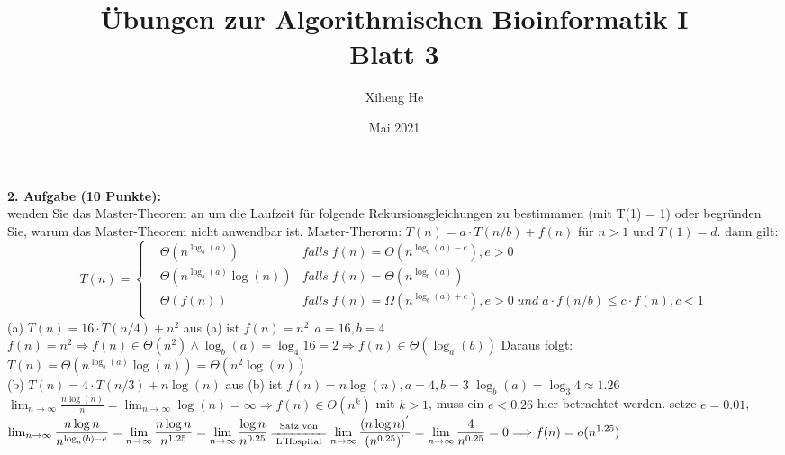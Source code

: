 \documentclass{article}
\title{Übungen zur Algorithmischen Bioinformatik I\\
Blatt 3}
\author{Xiheng He }
\date{Mai 2021}
\begin{document}
\maketitle
\begin{flushleft}
\textbf{2. Aufgabe (10 Punkte):}\\
wenden Sie das Master-Theorem an um die Laufzeit für folgende Rekursionsgleichungen zu bestimmmen (mit T(1) = 1) oder begründen Sie, warum das Master-Theorem nicht anwendbar ist.
\newline
Master-Therorm: $T(n) = a \cdot T(n/b) + f(n)$ für $n > 1$ und $T(1) = d$. dann gilt:
    $$ T(n)=\left\{
    \begin{aligned}
    &\Theta(n^{\log_b (a)}) & falls \; f(n) = O(n^{\log_b (a)-e}), e > 0 \\
    &\Theta(n^{\log_b (a)}\log(n)) & falls \; f(n) = \Theta(n^{\log_b(a)})\\
    &\Theta(f(n)) & falls \; f(n) = \Omega(n^{\log_b(a) + e}), e > 0 \; und \; a \cdot f(n/b) \le c \cdot f(n), c < 1\\ 
    \end{aligned}
    \right.
    $$
\newline
(a) $T(n) = 16 \cdot T(n/4) + n^2$
\newline
aus (a) ist $f(n) = n^2, a = 16, b = 4$
\newline
$f(n) = n^2 \Longrightarrow f(n) \in \Theta(n^2) \land \log_b(a) = \log_4 16 = 2 \Longrightarrow f(n) \in \Theta(\log_a(b))$
\newline
Daraus folgt: $T(n) = \Theta(n^{\log_b(a)}\log(n)) = \Theta(n^2\log(n))$
\newline\\
(b) $T(n) = 4 \cdot T(n/3) + n\log(n)$
\newline
aus (b) ist $f(n) = n\log(n), a = 4, b = 3$
\newline
$\log_b(a) = \log_3 4 \approx 1.26$
\newline
$\lim_{n\to\infty}\displaystyle\frac{n\log (n)}{n} = \lim_{n\to\infty}\log (n) = \infty \Longrightarrow f(n) \in O(n^k)$ mit $k > 1$, muss ein $e < 0.26$ hier betrachtet werden.  
\newline
setze $e = 0.01$, $\lim_{n\to\infty}\displaystyle\frac{n\log n}{n^{\log_a(b) - e}} = \lim_{n\to\infty}\displaystyle\frac{n\log n}{n^{1.25}} = \lim_{n\to\infty}\displaystyle\frac{\log n}{n^{0.25}}
\xlongequal[\text{L’Hospital}]{\text{Satz von}} \lim_{n\to\infty}\displaystyle\frac{(n\log n)^{'}}{(n^{0.25})^{'}} = \lim_{n\to\infty}\frac{4}{n^{0.25}} = 0 \Longrightarrow f(n) = o(n^{1.25})$

\end{flushleft}
\end{document}
